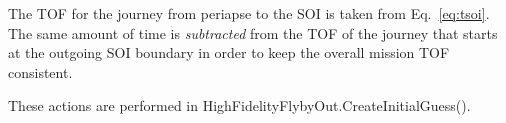 \documentclass[]{article}
\begin{document}
The \ac{TOF} for the journey from periapse to the \ac{SOI} is taken from Eq.~\eqref{eq:tsoi}. The same amount of time is \emph{subtracted} from the \ac{TOF} of the journey that starts at the outgoing \ac{SOI} boundary in order to keep the overall mission \ac{TOF} consistent.

These actions are performed in HighFidelityFlybyOut.CreateInitialGuess().







%
%
\end{document}
